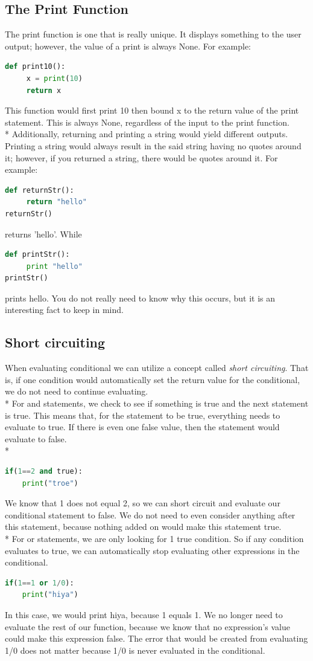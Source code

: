 \documentclass{article}
\begin{document}
\subsection{The Print Function}
The print function is one that is really unique. It displays something to the user output; however, the value of a print is always None. For example: 
\begin{lstlisting}[language = Python]
def print10():
     x = print(10)
     return x
\end{lstlisting}
This function would first print 10 then bound x to the return value of the print statement. This is always None, regardless of the input to the print function.
\\* 
\bigskip
Additionally, returning and printing a string would yield different outputs. Printing a string would always result in the said string having no quotes around it; however, if you returned a string, there would be quotes around it. For example: 
\begin{lstlisting}[language = Python]
def returnStr():
     return "hello"
returnStr()
\end{lstlisting}
returns 'hello'. While 
\begin{lstlisting}[language = Python]
def printStr():
     print "hello"
printStr()
\end{lstlisting}
prints hello. You do not really need to know why this occurs, but it is an interesting fact to keep in mind. 
\subsection{Short circuiting}
When evaluating conditional we can utilize a concept called \emph{short circuiting}. That is, if one condition would automatically set the return value for the conditional, we do not need to continue evaluating. \\*
\bigskip
For and statements, we check to see if something is true and the next statement is true. This means that, for the statement to be true, everything needs to evaluate to true. If there is even one false value, then the statement would evaluate to false. \\*
\begin{lstlisting}[language = Python]
if(1==2 and true):
    print("troe")
\end{lstlisting}
We know that 1 does not equal 2, so we can short circuit and evaluate our conditional statement to false. We do not need to even consider anything after this statement, because nothing added on would make this statement true.
\\*
\bigskip
For or statements, we are only looking for 1 true condition. So if any condition evaluates to true, we can automatically stop evaluating other expressions in the conditional. 
\begin{lstlisting}[language = Python]
if(1==1 or 1/0):
    print("hiya")
\end{lstlisting}
In this case, we would print hiya, because 1 equals 1. We no longer need to evaluate the rest of our function, because we know that no expression's value could make this expression false. The error that would be created from evaluating 1/0 does not matter because 1/0 is never evaluated in the conditional.
\newpage
{}
\end{document}
